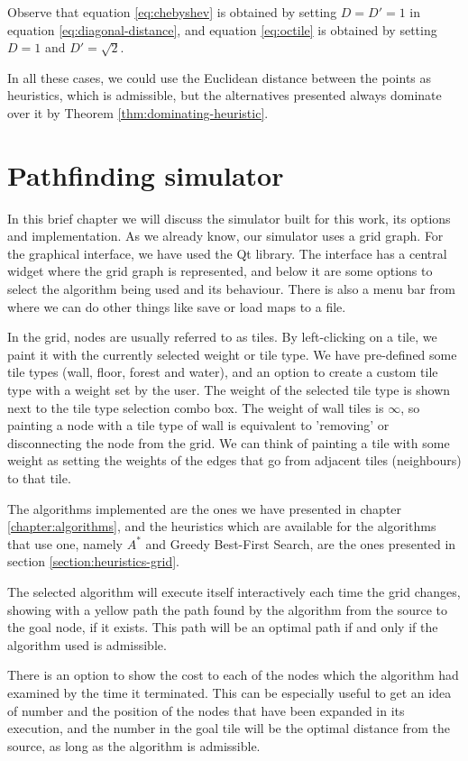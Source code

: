 \documentclass[a4paper,10pt]{report}
\begin{document}
Observe that equation \ref{eq:chebyshev} is obtained by setting $D = D' = 1$ in equation \ref{eq:diagonal-distance}, and equation \ref{eq:octile} is obtained by setting $D = 1$ and $D' = \sqrt{2}$.

In all these cases, we could use the Euclidean distance between the points as heuristics, which is admissible, but the alternatives presented always dominate over it by Theorem \ref{thm:dominating-heuristic}.


\chapter{Pathfinding simulator}

In this brief chapter we will discuss the simulator built for this work, its options and implementation. As we already know, our simulator uses a grid graph. For the graphical interface, we have used the Qt library. The interface has a central widget where the grid graph is represented, and below it are some options to select the algorithm being used and its behaviour. There is also a menu bar from where we can do other things like save or load maps to a file.

In the grid, nodes are usually referred to as tiles. By left-clicking on a tile, we paint it with the currently selected weight or tile type. We have pre-defined some tile types (wall, floor, forest and water), and an option to create a custom tile type with a weight set by the user. The weight of the selected tile type is shown next to the tile type selection combo box. The weight of wall tiles is $\infty$, so painting a node with a tile type of wall is equivalent to 'removing' or disconnecting the node from the grid. We can think of painting a tile with some weight as setting the weights of the edges that go from adjacent tiles (neighbours) to that tile.

The algorithms implemented are the ones we have presented in chapter \ref{chapter:algorithms}, and the heuristics which are available for the algorithms that use one, namely $A^*$ and Greedy Best-First Search, are the ones presented in section \ref{section:heuristics-grid}.

The selected algorithm will execute itself interactively each time the grid changes, showing with a yellow path the path found by the algorithm from the source to the goal node, if it exists. This path will be an optimal path if and only if the algorithm used is admissible.

There is an option to show the cost to each of the nodes which the algorithm had examined by the time it terminated. This can be especially useful to get an idea of number and the position of the nodes that have been expanded in its execution, and the number in the goal tile will be the optimal distance from the source, as long as the algorithm is admissible.
\end{document}
